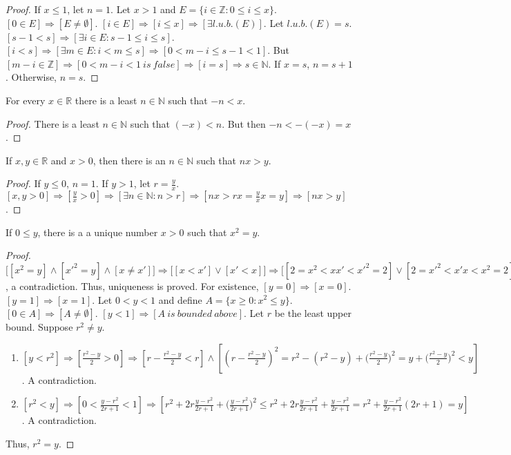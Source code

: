 \documentclass[crop=false,class=book]{standalone}
\begin{document}
\begin{proof}
If $x\leq1$, let $n=1$. Let $x>1$ and $E=\{i \in \mathbb{Z}: 0 \leq i \leq x\}$. $[0\in E]\Rightarrow [E\ne \emptyset]$. $[i\in E]\Rightarrow [i\leq x]\Rightarrow [\exists l.u.b.(E)]$. Let $l.u.b.(E)=s$. $[s-1<s]\Rightarrow [\exists i \in E:s-1 \leq i \leq s]$. $[i< s]\Rightarrow[\exists m\in E: i < m \leq s]\Rightarrow [0 < m-i \leq s-1 < 1]$. But $[m-i \in \mathbb{Z}]\Rightarrow [0<m-i<1\ is\ false]\Rightarrow [i = s]\Rightarrow s\in \mathbb{N}$. If $x=s$, $n = s+1$. Otherwise, $n=s$.
\end{proof}
\begin{corollary}
For every $x\in \mathbb{R}$ there is a least $n\in \mathbb{N}$ such that $-n<x$.
\end{corollary}
\begin{proof}
There is a least $n\in \mathbb{N}$ such that $(-x)<n$. But then $-n <-(-x) = x$. 
\end{proof}
\begin{corollary}
If $x,y\in \mathbb{R}$ and $x>0$, then there is an $n\in \mathbb{N}$ such that $nx>y$.
\end{corollary}
\begin{proof}
If $y\leq 0$, $n=1$. If $y>1$, let $r = \frac{y}{x}$. $[x,y>0]\Rightarrow [\frac{y}{x}>0]\Rightarrow [\exists n\in \mathbb{N}:n>r]\Rightarrow [nx > rx = \frac{y}{x}x = y]\Rightarrow[nx>y]$.
\end{proof}
\begin{theorem}
If $0\leq y$, there is a a unique number $x>0$ such that $x^2 = y$.
\end{theorem}
\begin{proof}
$\big[[x^2=y]\land [x'^2=y]\land [x\ne x']\big] \Rightarrow \big[[x<x']\lor[x'<x]\big] \Rightarrow \big[[2=x^2<xx'<x'^2=2]\lor[2=x'^2<x'x<x^2=2]\big]$, a contradiction. Thus, uniqueness is proved. For existence, $[y=0]\Rightarrow[x=0]$.$[y=1]\Rightarrow [x=1]$. Let $0 < y < 1$ and define $A = \{x\geq0:x^2 \leq y\}$. $[0\in A]\Rightarrow[A\ne \emptyset]$. $[y<1]\Rightarrow [A\ is\ bounded\ above]$. Let $r$ be the least upper bound. Suppose $r^2\ne y$.
\begin{enumerate}
\item $[y<r^2]\Rightarrow[\frac{r^2-y}{2}>0]\Rightarrow [r-\frac{r^2-y}{2}<r]\land[(r-\frac{r^2-y}{2})^2= r^2 - (r^2-y)+\big(\frac{r^2-y}{2}\big)^2 = y + \big(\frac{r^2-y}{2}\big)^2 < y]$. A contradiction.
\item $[r^2 <y]\Rightarrow [0<\frac{y-r^2}{2r+1}<1]\Rightarrow [r^2 + 2r\frac{y-r^2}{2r+1}+\big(\frac{y-r^2}{2r+1}\big)^2\leq r^2 + 2r\frac{y-r^2}{2r+1}+\frac{y-r^2}{2r+1} = r^2+\frac{y-r^2}{2r+1}(2r+1)=y]$. A contradiction.
\end{enumerate}
Thus, $r^2 = y$.
\end{proof}
\end{document}
